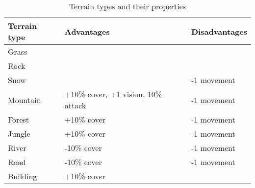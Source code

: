 \begin{table}[H]
    \label{tab:terrain}
    \begin{center}
    \begin{tabular}{| l | m{5cm} | m{5cm} |}
        \hline
        \textbf{Terrain type} & \textbf{Advantages} & \textbf{Disadvantages} \\
        \hline
        Grass &  &  \\
        \hline
        Rock &  &  \\
        \hline
        Snow &  & -1 movement \\
        \hline
        Mountain & +10\% cover, +1 vision, 10\% attack & -1 movement \\
        \hline
        Forest & +10\% cover & -1 movement \\
        \hline
        Jungle & +10\% cover & -1 movement \\
        \hline
        River & -10\% cover & -1 movement \\
        \hline
        Road & -10\% cover & -1 movement \\
        \hline
        Building & +10\% cover &  \\
        \hline
    \end{tabular}
    \end{center}
\caption{Terrain types and their properties}
\end{table}


